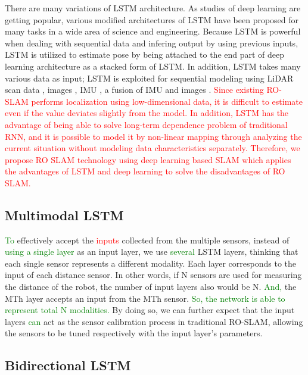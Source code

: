 \documentclass{ieeeaccess}
\begin{document}
There are many variations of LSTM architecture. As studies of deep learning are getting popular, various modified architectures of LSTM have been proposed for many tasks in a wide area of science and engineering. Because LSTM is powerful when dealing with sequential data and infering output by using previous inputs, LSTM is utilized to estimate pose by being attached to the end part of deep learning architecture \cite{wang2017deepvo, kendall2015posenet, turan2018deep}  as a stacked form of LSTM. In addition, LSTM takes many various data as input; LSTM is exploited for sequential modeling using LiDAR scan data \cite{gladh2016deep}, images \cite{walch2017image, wang2017deepvo}, IMU \cite{ordonez2016deep}, a fusion of IMU and images \cite{clark2017vinet}. \textcolor{red}{Since existing RO-SLAM performs localization using low-dimensional data, it is difficult to estimate even if the value deviates slightly from the model. In addition, LSTM has the advantage of being able to solve long-term dependence problem of traditional RNN, and it is possible to model it by non-linear mapping through analyzing the current situation without modeling data characteristics separately. Therefore, we propose RO SLAM technology using deep learning based SLAM which applies the advantages of LSTM and deep learning to solve the disadvantages of RO SLAM.}



\subsection{Multimodal LSTM}

\textcolor{green}{To} effectively accept the \textcolor{red}{inputs} collected from the multiple sensors, instead of \textcolor{green}{using a single layer} as an input layer, we use \textcolor{green}{several} LSTM layers, thinking that each single sensor represents a different modality. Each layer corresponds to the input of each distance sensor. In other words, if N sensors are used for measuring the distance of the robot, the number of input layers also would be N. \textcolor{green}{And,} the MTh layer accepts an input from the MTh sensor. \textcolor{green}{So, the network is able to represent total N modalities.} By doing so, we can further expect that the input layers \textcolor{green}{can} act as the sensor calibration process in traditional RO-SLAM, allowing the sensors to be tuned respectively with the input layer’s parameters.

\subsection{Bidirectional LSTM}
\end{document}
